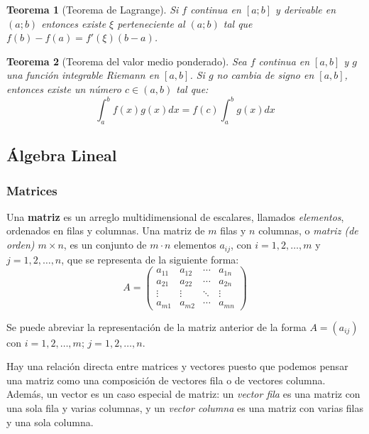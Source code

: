 \documentclass[12pt]{article}
\newtheorem{Teo}{Teorema}
\begin{document}
\begin{Teo}[Teorema de Lagrange] Si $f$ continua en $[a;b]$ y derivable en $(a;b)$ entonces existe $\xi$ perteneciente al $(a;b)$ tal que $f(b) - f(a) = f'(\xi)(b - a)$.
\end{Teo}

\begin{Teo}[Teorema del valor medio ponderado] Sea $f$ continua en $[a,b]$ y $g$ una función integrable Riemann en $[a,b]$. Si $g$ no cambia de signo en $[a,b]$, entonces existe un número $c \in (a,b)$ tal que:
$$\int_a^b f(x)g(x)dx = f(c) \int_a^b g(x)dx$$
\end{Teo}

\subsection{Álgebra Lineal}

\subsubsection{Matrices}

Una \textbf{matriz} es un arreglo multidimensional de escalares, llamados \textit{elementos}, ordenados en filas y columnas.  Una matriz de $ m $ filas y $ n $ columnas, o \textit{matriz (de orden) $ m \times n $}, es un conjunto de $ m \cdot n $ elementos $ a_{ij} $, con $ i = 1, 2, \ldots, m $ y $ j = 1, 2, \ldots, n $, que se representa de la siguiente forma:
$$A = \begin{pmatrix}
a_{11} & a_{12} & \cdots & a_{1n} \\
a_{21} & a_{22} & \cdots & a_{2n} \\
\vdots & \vdots & \ddots & \vdots \\
a_{m1} & a_{m2} & \cdots & a_{mn}
\end{pmatrix}$$

Se puede abreviar la representación de la matriz anterior de la forma $ A = (a_{ij}) $ con $ i = 1, 2, \ldots, m $; $ j = 1, 2, \ldots, n $.

Hay una relación directa entre matrices y vectores puesto que podemos pensar una matriz como una composición de vectores fila o de vectores columna. Además, un vector es un caso especial de matriz: un \textit{vector fila} es una matriz con una sola fila y varias columnas, y un \textit{vector columna} es una matriz con varias filas y una sola columna. 
\end{document}
